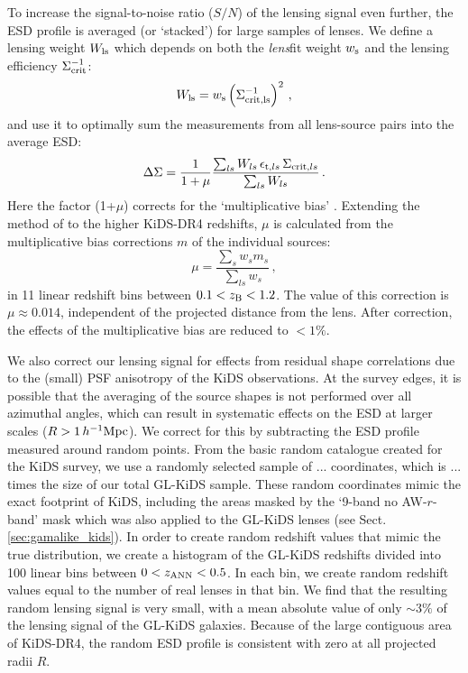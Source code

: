 \documentclass[usenatbib]{mnras}
\newcommand{\hMpc}{\, h^{-1}{\rm{Mpc}} }
\newcommand{\un}[1]{_{\rm #1}}
\begin{document}
To increase the signal-to-noise ratio ($S/N$) of the lensing signal even further, the ESD profile is averaged (or `stacked') for large samples of lenses. We define a lensing weight $W\un{ls}$ which depends on both the \emph{lens}fit weight $w\un{s}$ and the lensing efficiency $\Sigma\un{crit}^{-1}$:
\begin{equation}
	W_{\rm{ls}} = w_{\rm s} \left( \Sigma_{\rm crit,ls}^{-1} \right)^2 \, ,
	\label{eq:weights}
\end{equation}
and use it to optimally sum the measurements from all lens-source pairs into the average ESD:
\begin{equation}
	\Delta\Sigma = \frac{1}{1+\mu} \frac{\sum_{ls} W_{ls} \, \epsilon_{{\rm t},ls} \, \Sigma_{{\rm crit},ls} }{ \sum_{ls}{W_{ls}} }  \, .
	\label{eq:ESDmeasured}
\end{equation}
Here the factor (1+$\mu$) corrects for the `multiplicative bias' \cite[]{fenechconti2017}. Extending the method of \cite{dvornik2017} to the higher KiDS-DR4 redshifts, $\mu$ is calculated from the multiplicative bias corrections $m$ of the individual sources:
\begin{equation}
	\mu=\frac{\sum_{s} w_{s} m_{s}}{\sum_{ls} w_{s}} \, ,
	\label{eq:biascorr}
\end{equation}
in 11 linear redshift bins between \mbox{$0.1<z\un{B}<1.2$}. The value of this correction is $\mu\approx0.014$, independent of the projected distance from the lens. After correction, the effects of the multiplicative bias are reduced to $<1\%$.

We also correct our lensing signal for effects from residual shape correlations due to the (small) PSF anisotropy of the KiDS observations. At the survey edges, it is possible that the averaging of the source shapes is not performed over all azimuthal angles, which can result in systematic effects on the ESD at larger scales ($R>1\hMpc$). We correct for this by subtracting the ESD profile measured around random points. From the basic random catalogue created for the KiDS survey, we use a randomly selected sample of ... coordinates, which is ... times the size of our total GL-KiDS sample. These random coordinates mimic the exact footprint of KiDS, including the areas masked by the `9-band no AW-$r$-band' mask which was also applied to the GL-KiDS lenses (see Sect. \ref{sec:gamalike_kids}). In order to create random redshift values that mimic the true distribution, we create a histogram of the GL-KiDS redshifts divided into 100 linear bins between $0<z\un{ANN}<0.5$. In each bin, we create random redshift values equal to the number of real lenses in that bin. We find that the resulting random lensing signal is very small, with a mean absolute value of only $\sim3\%$ of the lensing signal of the GL-KiDS galaxies. Because of the large contiguous area of KiDS-DR4, the random ESD profile is consistent with zero at all projected radii $R$.
\end{document}
